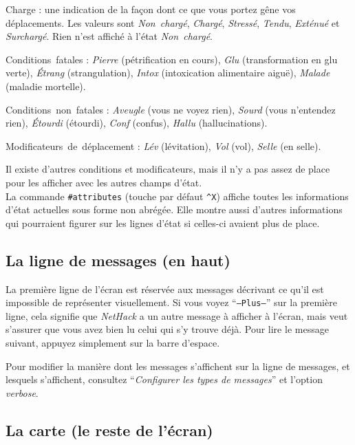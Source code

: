 \documentclass[titlepage]{article}
\begin{document}
\begin{description}
Charge :
une indication de la façon dont ce que vous portez gêne vos déplacements.
Les valeurs sont \textit{Non~chargé}, \textit{Chargé}, \textit{Stressé},
\textit{Tendu}, \textit{Exténué} et \textit{Surchargé}.
Rien n'est affiché à l'état \textit{Non~chargé}.

Conditions~fatales :
\textit{Pierre} (pétrification en cours),
\textit{Glu} (transformation en glu verte),
\textit{Étrang} (strangulation),
\textit{Intox} (intoxication alimentaire aiguë),
\textit{Malade} (maladie mortelle).

Conditions~non~fatales :
\textit{Aveugle} (vous ne voyez rien), \textit{Sourd} (vous n'entendez rien),
\textit{Étourdi} (étourdi), \textit{Conf} (confus), \textit{Hallu} (hallucinations).

Modificateurs~de~déplacement :
\textit{Lév} (lévitation), \textit{Vol} (vol), \textit{Selle} (en selle).

Il existe d'autres conditions et modificateurs, mais il n'y a pas assez de
place pour les afficher avec les autres champs d'état.
\\
La commande \texttt{\#attributes} (touche par défaut \texttt{\textasciicircum X}) affiche
toutes les informations d'état actuelles sous forme non abrégée.
Elle montre aussi d'autres informations qui pourraient figurer sur les
lignes d'état si celles-ci avaient plus de place.

\end{description}

\subsection*{La ligne de messages (en haut)}

La première ligne de l'écran est réservée aux messages décrivant
ce qu'il est impossible de représenter visuellement.  Si vous voyez
``\texttt{--Plus--}'' sur la première ligne, cela signifie que \textit{NetHack} a
un autre message à afficher à l'écran, mais veut s'assurer
que vous avez bien lu celui qui s'y trouve déjà.  Pour lire le message suivant,
appuyez simplement sur la barre d'espace.

Pour modifier la manière dont les messages s'affichent sur la ligne de messages,
et lesquels s'affichent, consultez ``\textit{Configurer les types de messages}'' et l'option \textit{verbose}.

\subsection*{La carte (le reste de l'écran)}
\end{document}
